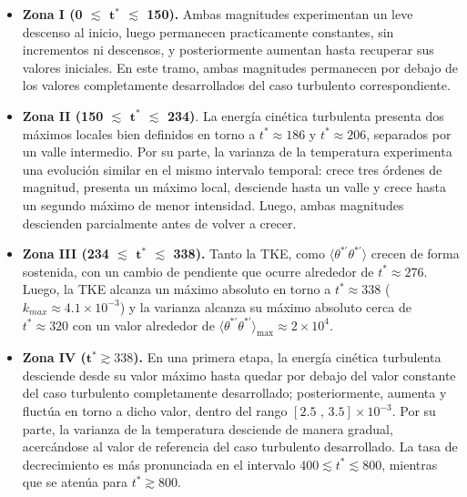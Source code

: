 \begin{itemize}
\item \textbf{Zona I (0 $\lesssim$ $\mathbf{t^*}$ $\lesssim$ 150).} Ambas magnitudes experimentan un leve descenso al inicio, luego permanecen practicamente constantes, sin incrementos ni descensos, y posteriormente aumentan hasta recuperar sus valores iniciales. En este tramo, ambas magnitudes permanecen por debajo de los valores completamente desarrollados del caso turbulento correspondiente. 

\item \textbf{Zona II (150 $\lesssim$ $\mathbf{t^*}$ $\lesssim$ 234)}. La energía cinética turbulenta presenta dos máximos locales bien definidos en torno a $t^*\approx186$ y $t^*\approx206$, separados por un valle intermedio. Por su parte, la varianza de la temperatura experimenta una evolución similar en el mismo intervalo temporal: crece tres órdenes de magnitud, presenta un máximo local, desciende hasta un valle y crece hasta un segundo máximo de menor intensidad. Luego, ambas magnitudes descienden parcialmente antes de volver a crecer.

\item \textbf{Zona III (234 $\lesssim$ $\mathbf{t^*}$ $\lesssim$ 338).} Tanto la TKE, como $\langle \theta^{* \prime} \theta^{* \prime} \rangle$ crecen de forma sostenida, con un cambio de pendiente que ocurre alrededor de $t^*\approx276$. Luego, la TKE alcanza un máximo absoluto en torno a $t^*\approx338$ ($k_{max} \approx 4\text{.}1 \times 10^{-3}$) y la varianza alcanza su máximo absoluto cerca de $t^*\approx320$ con un valor alrededor de $\langle \theta^{* \prime} \theta^{* \prime} \rangle_{\text{max}} \approx 2 \times 10^{4}$.

\item \textbf{Zona IV ($\mathbf{t^*} \gtrsim 338$).} En una primera etapa, la energía cinética turbulenta desciende desde su valor máximo hasta quedar por debajo del valor constante del caso turbulento completamente desarrollado; posteriormente, aumenta y fluctúa en torno a dicho valor, dentro del rango $\left[ 2\text{.}5 \text{ , } 3\text{.}5 \right] \times 10^{-3}$. Por su parte, la varianza de la temperatura desciende de manera gradual, acercándose al valor de referencia del caso turbulento desarrollado. La tasa de decrecimiento es más pronunciada en el intervalo $400 \lesssim t^* \lesssim 800$, mientras que se atenúa para $t^* \gtrsim 800$.
\end{itemize}


